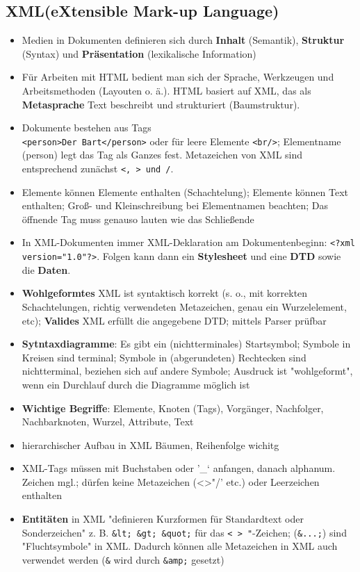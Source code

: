 \documentclass[12pt,landscape]{article}
\begin{document}
\begin{multicols}{3}
\section{XML(eXtensible Mark-up Language)}
\begin{itemize}
\item Medien in Dokumenten definieren sich durch \textbf{Inhalt} (Semantik), \textbf{Struktur} (Syntax) und \textbf{Präsentation} (lexikalische Information)
\item Für Arbeiten mit HTML bedient man sich der Sprache, Werkzeugen und Arbeitsmethoden (Layouten o. ä.). HTML basiert auf XML, das als \textbf{Metasprache} Text beschreibt und strukturiert (Baumstruktur). 
\item Dokumente bestehen aus Tags\\
\lstinline|<person>Der Bart</person>| oder für leere Elemente \lstinline|<br/>|; Elementname (person) legt das Tag als Ganzes fest. Metazeichen von XML sind entsprechend zunächst \lstinline|<, > und /|.
\item Elemente können Elemente enthalten (Schachtelung); Elemente können Text enthalten; Groß- und Kleinschreibung bei Elementnamen beachten; Das öffnende Tag muss genauso lauten wie das Schließende
\item In XML-Dokumenten immer XML-Deklaration am Dokumentenbeginn: \lstinline|<?xml version="1.0"?>|. Folgen kann dann ein \textbf{Stylesheet} und eine \textbf{DTD} sowie die \textbf{Daten}.
\item \textbf{Wohlgeformtes} XML ist syntaktisch korrekt (s. o., mit korrekten Schachtelungen, richtig verwendeten Metazeichen, genau ein Wurzelelement, etc); \textbf{Valides} XML erfüllt die angegebene DTD; mittels Parser prüfbar
\item \textbf{Sytntaxdiagramme}: Es gibt ein (nichtterminales) Startsymbol; Symbole in Kreisen sind terminal; Symbole in (abgerundeten) Rechtecken sind nichtterminal, beziehen sich auf andere Symbole; Ausdruck ist "wohlgeformt", wenn ein Durchlauf durch die Diagramme möglich ist
\item \textbf{Wichtige Begriffe}: Elemente, Knoten (Tags), Vorgänger, Nachfolger, Nachbarknoten, Wurzel, Attribute, Text
\item hierarchischer Aufbau in XML Bäumen, Reihenfolge wichitg
\item XML-Tags müssen mit Buchstaben oder '\_` anfangen, danach alphanum. Zeichen mgl.; dürfen keine Metazeichen (<>"/' etc.) oder Leerzeichen enthalten
\item \textbf{Entitäten} in XML "definieren Kurzformen für Standardtext oder Sonderzeichen" z. B. \lstinline|&lt; &gt; &quot;| für das \lstinline|< > "|-Zeichen; (\lstinline|&...;|) sind "Fluchtsymbole" in XML. Dadurch können alle Metazeichen in XML auch verwendet werden (\lstinline|&| wird durch \lstinline|&amp;| gesetzt)

\end{itemize}
\end{multicols}
\end{document}
